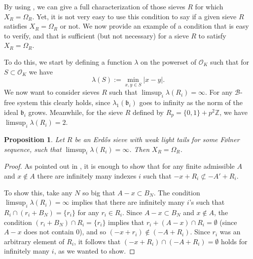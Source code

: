 \documentclass[a4paper,11pt,reqno]{amsart}
\theoremstyle{plain}
\newtheorem{proposition}[theorem]{Proposition}
\theoremstyle{remark}
\newcommand{\z}{\mathbb{Z}}
\newcommand{\cb}{\mathcal{B}}
\newcommand{\co}{\mathcal{O}}
\newcommand{\gb}{\mathfrak{b}}
\begin{document}
			
			
			
			
			
			
			
			
			
		
			
			By using  , we can give a full characterization of those sieves $R$ for which $X_R = \Omega_{R}$. Yet, it is not very easy to use this condition to say if a given sieve $R$ satisfies $X_R = \Omega_{R}$ or not. We now provide an example of a condition that is easy to verify, and that is sufficient (but not necessary) for a sieve $R$ to satisfy  $X_R = \Omega_{R}$.
			
			To do this, we start by defining a function $\lambda$ on the powerset of $\co_K$ such that for $S \subset \co_K$ we have
			\begin{equation}
				\label{eq: lambdaS}
				\lambda(S) := \min_{x,y \in S} |x-y|.
			\end{equation}  We now want to consider sieves $R$ such that $\limsup_{i} \lambda(R_i) = \infty$. For any $\cb$-free system this clearly holds, since $\lambda_1(\gb_i)$ goes to infinity as the norm of the ideal $\gb_i$ grows. Meanwhile, for the sieve $R$ defined by $R_p = \{0,1\} + p^2\z$, we have $\limsup_{i} \lambda(R_i) = 2$.
			
			\begin{proposition}
				\label{prop: lim lambda infty implies XR = OmegaR}
				Let $R$ be an Erdős sieve with weak light tails for some Følner sequence, such that $\limsup_{i} \lambda(R_i) = \infty$. Then $X_R = \Omega_{R}$.
			\end{proposition}
			
			\begin{proof}
				As pointed out in , it is enough to show that for any finite admissible $A$ and $x \not \in A$ there are infinitely many indexes $i$ such that $-x +R_i \not \subset -A'+R_i$.
				
				To show this, take any $N$ so big that $A-x \subset B_N$. The condition $\limsup_{i} \lambda(R_i) = \infty$ implies that there are infinitely many $i$'s such that $R_i \cap (r_i + B_N) = \{r_i\}$ for any $r_i \in R_i$. Since $A-x \subset B_N$ and $x \not \in A$, the condition $(r_i + B_N) \cap R_i  = \{r_{i}\}$ implies that $r_{i} + (A-x) \cap R_{i} = \emptyset$ (since $A-x$ does not contain $0$), and so $(-x+r_i)\not \in (-A+R_i)$. Since $r_i$ was an arbitrary element of $R_i$, it follows that $(-x+R_i)\cap(-A+R_i) = \emptyset$ holds for infinitely many $i$, as we wanted to show.		
			\end{proof}
			
\end{document}

